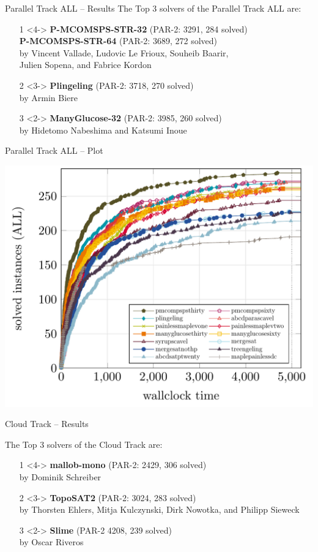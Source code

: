 \documentclass{beamer}
\begin{document}
\begin{frame}{Parallel Track ALL -- Results}
The Top 3 solvers of the Parallel Track ALL are:
\begin{itemize}
\item[1]<4-> {\bf P-MCOMSPS-STR-32} (PAR-2: 3291, 284 solved)\\
{\bf P-MCOMSPS-STR-64} (PAR-2: 3689, 272 solved)\\
by Vincent Vallade, Ludovic Le Frioux, Souheib Baarir,\\Julien Sopena, and Fabrice Kordon
\item[2]<3-> {\bf Plingeling} (PAR-2: 3718, 270 solved)\\
by Armin Biere
\item[3]<2-> {\bf ManyGlucose-32} (PAR-2: 3985, 260 solved)\\
by Hidetomo Nabeshima and Katsumi Inoue
\end{itemize}
\end{frame}

\begin{frame}{Parallel Track ALL -- Plot}

\centering
\includegraphics[width=.8\textwidth]{parallel-ALL}

\end{frame}



\begin{frame}{Cloud Track -- Results}

The Top 3 solvers of the Cloud Track are:
\begin{itemize}

\item[1]<4-> {\bf mallob-mono} (PAR-2: 2429, 306 solved)\\
by Dominik Schreiber
\item[2]<3-> {\bf TopoSAT2} (PAR-2: 3024, 283 solved)\\
by Thorsten Ehlers, Mitja Kulczynski, Dirk Nowotka, and Philipp Sieweck
\item[3]<2-> {\bf Slime} (PAR-2 4208, 239 solved)\\
by Oscar Riveros
\end{itemize}


\end{frame}
\end{document}
